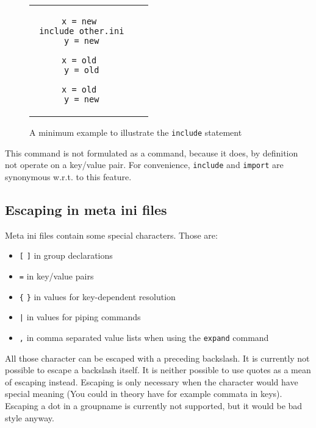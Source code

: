 \documentclass[11pt]{article}
\begin{document}
\begin{figure}
\begin{tabular}{ccc}
\begin{minipage}{.4\linewidth}
\begin{lstlisting}[title={include.ini}]
 x = new
 include other.ini
 y = new
\end{lstlisting}
\end{minipage}

\begin{minipage}{.3\linewidth}
\begin{lstlisting}[title={other.ini}]
 x = old
 y = old
\end{lstlisting}
\end{minipage}

\begin{minipage}{.3\linewidth}
\begin{lstlisting}[title={Result}]
 x = old
 y = new
\end{lstlisting}
\end{minipage}
\end{tabular}
\caption{A minimum example to illustrate the \lstinline!include! statement}
\label{fig:include}
\end{figure}

This command is not formulated as a command, because it does, by definition not operate on a key/value pair. For convenience, \lstinline!include! and \lstinline!import! are synonymous w.r.t. to this feature.

\subsection{Escaping in meta ini files}
Meta ini files contain some special characters. Those are:
\begin{itemize}
 \item \lstinline![! \lstinline!]! in group declarations
 \item \lstinline!=! in key/value pairs
 \item \lstinline!{! \lstinline!}! in values for key-dependent resolution
 \item \lstinline!|! in values for piping commands
 \item \lstinline!,! in comma separated value lists when using the \lstinline!expand! command
\end{itemize}
All those character can be escaped with a preceding backslash. It is currently not possible to escape a backslash itself. It is neither possible to use quotes as a mean of escaping instead. Escaping is only necessary when the character would have special meaning (You could in theory have for example commata in keys). Escaping a dot in a groupname is currently not supported, but it would be bad style anyway.
\end{document}
